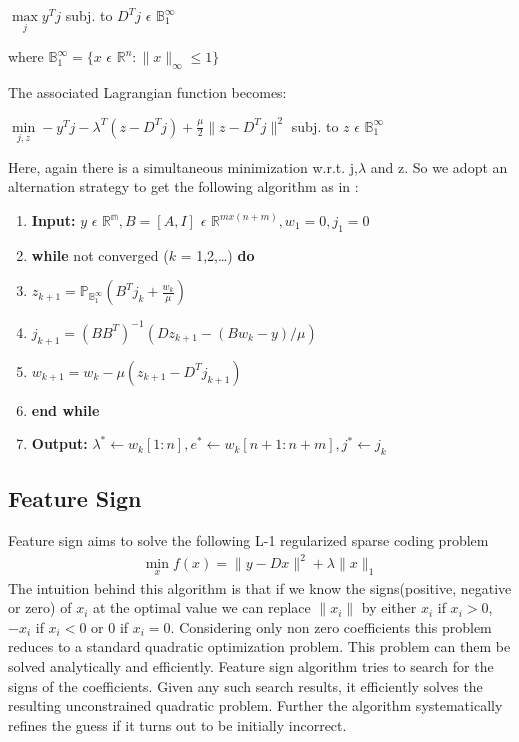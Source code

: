 \documentclass{article} %
\begin{document}
\begin{center}
$\max\limits_j y^Tj$ subj. to $D^Tj$ $\epsilon$ $\mathbb{B}_1^\infty$
\end{center}
where $\mathbb{B}_1^\infty = \{x$ $\epsilon$ $\mathbb{R}^n : \|x\|_\infty \leq 1\}$

The associated Lagrangian function becomes:
\begin{center}
$\min\limits_{j,z} -y^Tj - \lambda^T(z-D^Tj) + \frac{\mu}{2}\|z-D^Tj\|^2$ subj. to $z$ $\epsilon$ $\mathbb{B}_1^\infty$
\end{center} 

Here, again there is a simultaneous minimization w.r.t. j,$\lambda$ and z. So we adopt an alternation strategy to get the following algorithm as in \citep{yang2010fast}:

\begin{enumerate}
\item \textbf{Input:} $y$ $\epsilon$ $\mathbb{R^m}, B = [A,I]$ $\epsilon$ $\mathbb{R}^{mx(n+m)}, w_1 = 0, j_1 = 0$
\item \textbf{while} not converged ($k$ = 1,2,\ldots) \textbf{do}
\item \hspace{.4cm} $z_{k+1} = \mathbb{P}_{\mathbb{B}_1^\infty}(B^Tj_k + \frac{w_k}{\mu})$
\item \hspace{.4cm} $j_{k+1} = (BB^T)^{-1}(Dz_{k+1} - (Bw_k - y)/\mu)$
\item \hspace{.4cm} $w_{k+1} = w_k - \mu(z_{k+1} - D^Tj_{k+1})$
\item \textbf{end while}
\item \textbf{Output: }$\lambda^{*} \leftarrow w_k[1:n], e^{*} \leftarrow w_k[n+1:n+m], j^{*} \leftarrow j_k$
\end{enumerate}

\subsection{Feature Sign}
Feature sign aims to solve the following L-1 regularized sparse coding problem
\begin{align}
\min_x f(x) = \|y - Dx\|^2 + \lambda\|x\|_1
\end{align}
The intuition behind this algorithm is that if we know the signs(positive, negative or zero) of $x_i$ at the optimal value we can replace $\|x_i\|$ by either $x_i$ if $x_i > 0$, $-x_i$ if $x_i < 0$ or 0 if $x_i = 0$. Considering only non zero coefficients this problem reduces to a standard quadratic optimization problem. This problem can them be solved analytically and efficiently. Feature sign algorithm tries to search for the signs of the coefficients. Given any such search results, it efficiently solves the resulting unconstrained quadratic problem. Further the algorithm systematically refines the guess if it turns out to be initially incorrect.
\end{document}

